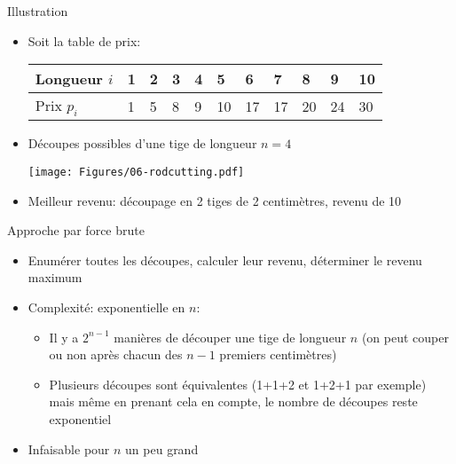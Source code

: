\begin{frame}{Illustration}
\begin{itemize}
\item Soit la table de prix:
\bigskip

\begin{center}\small
\begin{tabular}{l|llllllllll}
Longueur $i$ & 1 & 2 & 3 & 4 & 5 & 6 & 7 & 8 & 9 & 10\\
\hline
Prix $p_i$ & 1 & 5 & 8 & 9 & 10 & 17 & 17 & 20 & 24 & 30\\
\end{tabular}
\end{center}

\bigskip

\item Découpes possibles d'une tige de longueur $n=4$

\bigskip

\centerline{\texttt{[image: Figures/06-rodcutting.pdf]}}

\bigskip

\item Meilleur revenu: découpage en 2 tiges de 2 centimètres, revenu de 10
\end{itemize}
\end{frame}

\begin{frame}{Approche par force brute}

\begin{itemize}
\item Enumérer toutes les découpes, calculer leur revenu, déterminer le revenu maximum
\item Complexité: exponentielle en $n$:
\begin{itemize}
\item Il y a $2^{n-1}$ manières de découper une tige de longueur $n$ (on peut couper ou non après chacun des $n-1$ premiers centimètres)
\item Plusieurs découpes sont équivalentes (1+1+2 et 1+2+1 par
  exemple) mais même en prenant cela en compte, le nombre de découpes
  reste exponentiel
\end{itemize}
\item Infaisable pour $n$ un peu grand
\end{itemize}

\end{frame}

